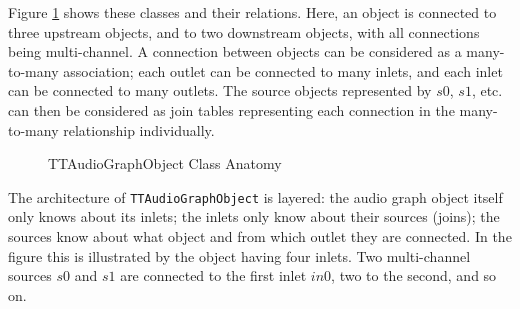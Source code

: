 \documentclass[twoside,a4paper]{article}
\begin{document}
Figure \ref{fig:anatomy} shows these classes and their relations. Here, an object is connected to three upstream objects, and to two downstream objects, with all connections being multi-channel. 
A connection between objects can be considered as a many-to-many association; each outlet can be connected to many inlets, and each inlet can be connected to many outlets. 
The source objects represented by $s0$, $s1$, etc. can then be considered as join tables representing each connection in the many-to-many relationship individually.

%
\begin{figure}[!htbp]
\centerline{}
\caption{TTAudioGraphObject Class Anatomy}
\label{fig:anatomy}
\end{figure}
%
\noindent The architecture of \texttt{TTAudioGraphObject} is layered: the audio graph object itself only knows about its inlets; the inlets only know about their sources (joins); the sources know about what object and from which outlet they are connected. 
In the figure this is illustrated by the object having four inlets. 
Two multi-channel sources $s0$ and $s1$ are connected to the first inlet $in0$, two to the second, and so on. 
\end{document}
